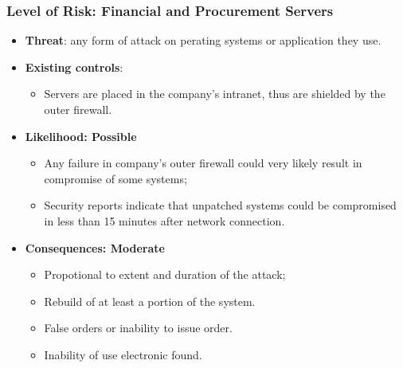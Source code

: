 \documentclass[xcolor ={table,usenames,dvipsnames}]{beamer}
\theoremstyle{definition}
\begin{document}
	\begin{frame}
		\frametitle{Level of Risk: Financial and Procurement Servers}
		\begin{itemize}
			\item \textbf{Threat}: any form of attack on perating systems or application they use.
			\item \textbf{Existing controls}: 
			\begin{itemize}
				\item Servers are placed in the company's intranet, thus are shielded by the outer firewall.
			\end{itemize} 
			\item \textbf{Likelihood: Possible }
			\begin{itemize}
				\item Any failure in company's outer firewall could very likely result in compromise of some systems;
				\item Security reports indicate that unpatched systems could be compromised in less than 15 minutes after network connection. 
			\end{itemize}	
			\item \textbf{Consequences: Moderate }
			\begin{itemize}
				\item Propotional to extent and duration of the attack;
				\item Rebuild of at least a portion of the system.
				\item False orders or inability to issue order.
				\item Inability of use electronic found. 
			\end{itemize}
		\end{itemize}
	\end{frame}
\end{document}
